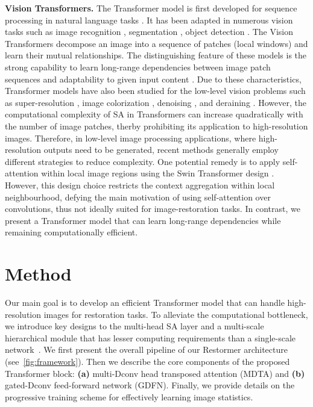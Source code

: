 \documentclass[10pt,twocolumn,letterpaper]{article}
\def\xnet{Restormer\xspace}
\begin{document}
\noindent \textbf{Vision Transformers.} The Transformer model is first developed for sequence processing in natural language tasks \cite{vaswani2017attention}. 
It has been adapted in numerous vision tasks such as image recognition \cite{vision_transformer,touvron2021deit,yuan2021tokens}, segmentation \cite{wang2021pyramid,xie2021segformer,zheng2021rethinking}, object detection \cite{carion2020end, zhu2020deformable, liu2021swin}. 
The Vision Transformers \cite{vision_transformer, touvron2021deit} decompose an image into a sequence of patches (local windows) and learn their mutual relationships. 
The distinguishing feature of these models is the strong capability to  learn long-range dependencies between image patch sequences and adaptability to given input content \cite{khan2021transformers}. 
Due to these characteristics, Transformer models have also been studied for the low-level vision problems such as super-resolution \cite{yang2020learning, liang2021swinir}, image colorization \cite{kumar2021colorization}, denoising \cite{chen2021IPT, wang2021uformer}, and deraining \cite{wang2021uformer}. 
However, the computational complexity of SA in Transformers can increase quadratically with the number of image patches, therby prohibiting its application to high-resolution images. 
Therefore, in low-level image processing applications, where high-resolution outputs need to be generated, recent methods generally employ different strategies to reduce complexity. 
One potential remedy is to apply self-attention within local image regions \cite{liang2021swinir, wang2021uformer} using the Swin Transformer design \cite{liang2021swinir}. 
However, this design choice restricts the context aggregation within local neighbourhood, defying the main motivation of using self-attention over convolutions, thus not ideally suited for image-restoration tasks. 
In contrast, we present a Transformer model that can learn long-range dependencies while remaining 
computationally efficient.







\section{Method}\label{sec:method}Our main goal is to develop an efficient Transformer model that can handle high-resolution images for  restoration tasks.  
To alleviate the computational bottleneck, we introduce key designs to the multi-head SA layer and a multi-scale hierarchical module that has lesser computing requirements than a single-scale network~\cite{liang2021swinir}. 
We first present the overall pipeline of our \xnet architecture (see~\cref{fig:framework}). 
Then we describe the core components of the proposed Transformer block: \textbf{(a)} multi-Dconv head transposed attention (MDTA) and \textbf{(b)} gated-Dconv feed-forward network (GDFN). 
Finally, we provide details on the progressive training scheme for effectively learning image statistics.  
\end{document}
